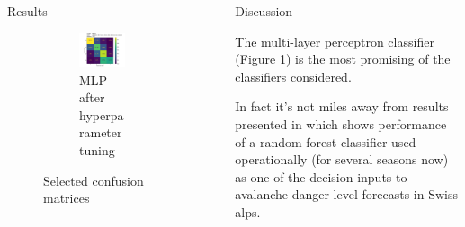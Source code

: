 \documentclass[final]{beamer}
\newlength{\sepwidth}
\newlength{\colwidth}
\newcommand{\separatorcolumn}{\begin{column}{\sepwidth}\end{column}}
\begin{document}
\begin{frame}[t]
\begin{columns}[t]
\begin{column}{\colwidth}
\begin{block}{Results}
\begin{figure}[htbp]
\begin{subfigure}[b]{0.32\textwidth}
    \end{subfigure}
    \hfill
    \begin{subfigure}[b]{0.32\textwidth}
        \centering
        \includegraphics[width=\textwidth]{assets/figures/sais_confusion_matrix_MLP(T)_weather_48h_hourly_then_daily_data_across_season_test.png}
        \caption{MLP after hyperparameter tuning}
        \label{fig:subfig3mlp}
    \end{subfigure}
    \caption{Selected confusion matrices}
    \label{fig:confusion_matrices}
\end{figure}

  \end{block}

\end{column}

\separatorcolumn

\begin{column}{\colwidth}

  \begin{block}{Discussion}


	The multi-layer perceptron classifier (Figure \ref{fig:subfig3mlp}) is the most promising of the classifiers considered. 
    
	In fact it's not miles away from results presented in \cite{egusphere-2024-2374} which shows performance of a random forest classifier used operationally (for several seasons now) as one of the decision inputs to avalanche danger level forecasts in Swiss alps. 


\end{block}
\end{column}
\end{columns}
\end{frame}
\end{document}
